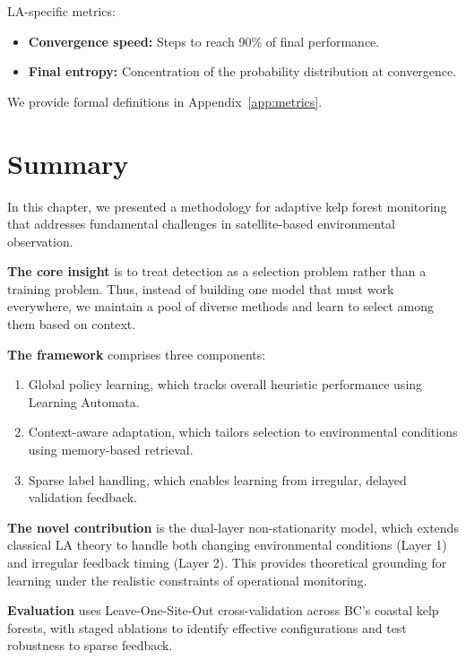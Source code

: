 \documentclass[11pt,a4paper]{article}
\begin{document}
LA-specific metrics:
\begin{itemize}[noitemsep]
    \item \textbf{Convergence speed:} Steps to reach 90\% of final performance.
    \item \textbf{Final entropy:} Concentration of the probability distribution at convergence.
\end{itemize}

We provide formal definitions in Appendix~\ref{app:metrics}.


\section{Summary}
\label{sec:summary}

In this chapter, we presented a methodology for adaptive kelp forest monitoring that addresses fundamental challenges in satellite-based environmental observation.

\textbf{The core insight} is to treat detection as a selection problem rather than a training problem. Thus, instead of building one model that must work everywhere, we maintain a pool of diverse methods and learn to select among them based on context.

\textbf{The framework} comprises three components:
\begin{enumerate}
    \item Global policy learning, which tracks overall heuristic performance using Learning Automata.
    \item Context-aware adaptation, which tailors selection to environmental conditions using memory-based retrieval.
    \item Sparse label handling, which enables learning from irregular, delayed validation feedback.
\end{enumerate}

\textbf{The novel contribution} is the dual-layer non-stationarity model, which extends classical LA theory to handle both changing environmental conditions (Layer 1) and irregular feedback timing (Layer 2). This provides theoretical grounding for learning under the realistic constraints of operational monitoring.

\textbf{Evaluation} uses Leave-One-Site-Out cross-validation across BC's coastal kelp forests, with staged ablations to identify effective configurations and test robustness to sparse feedback.
\end{document}
